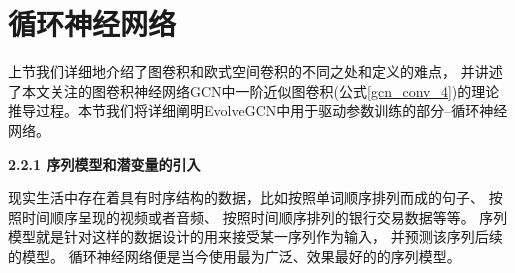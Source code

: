   \section{循环神经网络} \label{sec:B2}

      上节我们详细地介绍了图卷积和欧式空间卷积的不同之处和定义的难点，
      并讲述了本文关注的图卷积神经网络GCN中一阶近似图卷积(公式\ref{gcn_conv_4})的理论
      推导过程。本节我们将详细阐明EvolveGCN中用于驱动参数训练的部分--循环神经网络。

      \textbf{2.2.1 序列模型和潜变量的引入}

      现实生活中存在着具有时序结构的数据，比如按照单词顺序排列而成的句子、
      按照时间顺序呈现的视频或者音频、
      按照时间顺序排列的银行交易数据等等。
      序列模型就是针对这样的数据设计的用来接受某一序列作为输入，
      并预测该序列后续的模型。
      循环神经网络便是当今使用最为广泛、效果最好的的序列模型。


